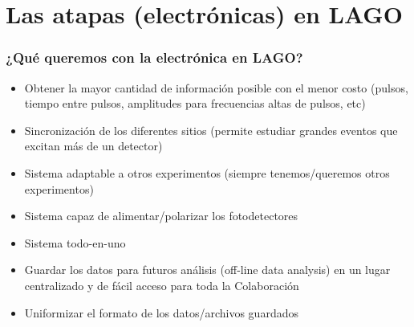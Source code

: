 \documentclass{beamer}
\begin{document}
%
%

\section{Las atapas (electrónicas) en LAGO}

\begin{frame}
	\frametitle{¿Qué queremos con la electrónica en LAGO?}
		\begin{block}{}
    	\begin{itemize}
      	\item Obtener la mayor cantidad de información
							posible con el menor costo (pulsos, tiempo
							entre pulsos, amplitudes para frecuencias
							altas de pulsos, etc) 
											\pause
      	\item Sincronización de los diferentes sitios (permite estudiar grandes
							eventos que excitan más de un detector)
											\pause
      	\item Sistema adaptable a otros experimentos (siempre tenemos/queremos
							otros experimentos)
											\pause
      	\item Sistema capaz de alimentar/polarizar los fotodetectores
											\pause
      	\item Sistema todo-en-uno
											\pause
        \item Guardar los datos para futuros análisis (off-line data analysis)
              en un lugar centralizado y de fácil acceso para toda la
							Colaboración
											\pause
							\item \alert{Uniformizar el formato de los datos/archivos
											guardados}

    	\end{itemize}
		\end{block}
\end{frame} 
\end{document}
